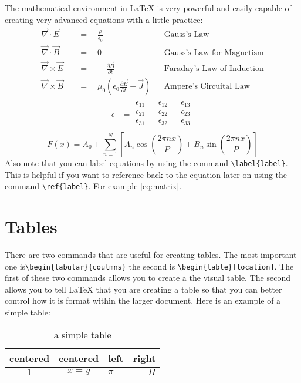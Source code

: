 \documentclass{article} 	%
\numberwithin{equation}{section}
\newcommand{\tensor}[1]{\bar{\bar{#1}}}		%
\begin{document}
		The mathematical environment in \LaTeX{} is very powerful and easily capable of creating very advanced equations with a little practice:
		\begin{align} 				%
		\vec{\nabla} \cdot \vec{E} \quad &=\quad\frac{\rho}{\epsilon_{0}} &&\text{Gauss's Law} \label{eq:GL}\\  	%
		\vec{\nabla} \cdot \vec{B} \quad &=\quad 0 &&\text{Gauss's Law for Magnetism} \label{eq:GLM}\\
		\vec{\nabla} \times \vec{E} \quad &=\hspace{10pt}-\frac{\partial{\vec{B}}}{\partial{t}} &&\text{Faraday's Law of Induction} \label{eq:FL}\\
		\vec{\nabla} \times \vec{B} \quad &=\quad \mu_0 \left( \epsilon_0\frac{\partial{\vec{E}}}{\partial{t}}+\vec{J} \right) &&\text{Ampere's Circuital Law} \label{eq:AL}
		\end{align}
		\begin{align}
		\tensor{\epsilon} &= \begin{matrix} %
			\epsilon_{11} && \epsilon_{12} &&\epsilon_{13} \\
			\epsilon_{21} && \epsilon_{22} &&\epsilon_{23} \\
			\epsilon_{31} && \epsilon_{32} &&\epsilon_{33} \\
		\end{matrix}
		\label{eq:matrix}  %
		\end{align}
		\begin{equation}
		F(x)= A_0 + \sum_{n=1}^N\left[ A_n\cos{\left(\frac{2\pi nx}{P}\right)}+B_n\sin{\left(\frac{2\pi nx}{P}\right)}\right]
		\end{equation}
		Also note that you can label equations by using the command \verb|\label{label}|.  This is helpful if you want to reference back to the equation later on using the command \verb|\ref{label}|.  For example \ref{eq:matrix}.
	\section{Tables}
	There are two commands that are useful for creating tables.  The most important one is\verb|\begin{tabular}{coulmns}| the second is \verb|\begin{table}[location]|.  The first of these two commands allows you to create a the visual table.  The second allows you to tell \LaTeX{} that you are creating a table so that you can better control how it is format within the larger document.  Here is an example of a simple table:
	\begin{table}[h]
		\caption{a simple table}
		\centering
		\begin{tabular}{|cc|l|r|}
			\hline
			centered & centered & left & right \\
			\hline
			$1$ & $x=y$&$\pi$&$\Pi$\\
			\hline
		\end{tabular}
	\end{table}
\end{document}

